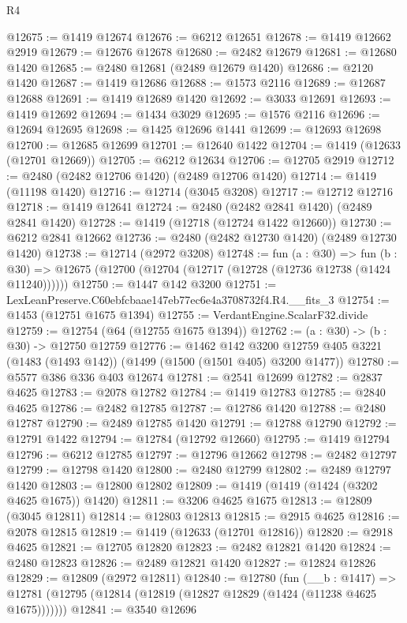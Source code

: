 \begin{lexlean}{R4}
\begin{coremodule}
@12675 := @1419 @12674
@12676 := @6212 @12651
@12678 := @1419 @12662 @2919
@12679 := @12676 @12678
@12680 := @2482 @12679
@12681 := @12680 @1420
@12685 := @2480 @12681 (@2489 @12679 @1420)
@12686 := @2120 @1420
@12687 := @1419 @12686
@12688 := @1573 @2116
@12689 := @12687 @12688
@12691 := @1419 @12689 @1420
@12692 := @3033 @12691
@12693 := @1419 @12692
@12694 := @1434 @3029
@12695 := @1576 @2116
@12696 := @12694 @12695
@12698 := @1425 @12696 @1441
@12699 := @12693 @12698
@12700 := @12685 @12699
@12701 := @12640 @1422
@12704 := @1419 (@12633 (@12701 @12669))
@12705 := @6212 @12634
@12706 := @12705 @2919
@12712 := @2480 (@2482 @12706 @1420) (@2489 @12706 @1420)
@12714 := @1419 (@11198 @1420)
@12716 := @12714 (@3045 @3208)
@12717 := @12712 @12716
@12718 := @1419 @12641
@12724 := @2480 (@2482 @2841 @1420) (@2489 @2841 @1420)
@12728 := @1419 (@12718 (@12724 @1422 @12660))
@12730 := @6212 @2841 @12662
@12736 := @2480 (@2482 @12730 @1420) (@2489 @12730 @1420)
@12738 := @12714 (@2972 @3208)
@12748 := fun (a : @30) =>
  fun (b : @30) => @12675 (@12700 (@12704 (@12717 (@12728 (@12736 @12738 (@1424 @11240))))))
@12750 := @1447 @142 @3200
@12751 := LexLeanPreserve.C60ebfcbaae147eb77ec6e4a3708732f4.R4.__fits_3
@12754 := @1453 (@12751 @1675 @1394)
@12755 := VerdantEngine.ScalarF32.divide
@12759 := @12754 (@64 (@12755 @1675 @1394))
@12762 := (a : @30) -> (b : @30) -> @12750 @12759
@12776 := @1462
    @142
    @3200
    @12759
    @405
    @3221
    (@1483 (@1493 @142))
    (@1499 (@1500 (@1501 @405) @3200 @1477))
@12780 := @5577 @386 @336 @403 @12674
@12781 := @2541 @12699
@12782 := @2837 @4625
@12783 := @2078 @12782
@12784 := @1419 @12783
@12785 := @2840 @4625
@12786 := @2482 @12785
@12787 := @12786 @1420
@12788 := @2480 @12787
@12790 := @2489 @12785 @1420
@12791 := @12788 @12790
@12792 := @12791 @1422
@12794 := @12784 (@12792 @12660)
@12795 := @1419 @12794
@12796 := @6212 @12785
@12797 := @12796 @12662
@12798 := @2482 @12797
@12799 := @12798 @1420
@12800 := @2480 @12799
@12802 := @2489 @12797 @1420
@12803 := @12800 @12802
@12809 := @1419 (@1419 (@1424 (@3202 @4625 @1675)) @1420)
@12811 := @3206 @4625 @1675
@12813 := @12809 (@3045 @12811)
@12814 := @12803 @12813
@12815 := @2915 @4625
@12816 := @2078 @12815
@12819 := @1419 (@12633 (@12701 @12816))
@12820 := @2918 @4625
@12821 := @12705 @12820
@12823 := @2482 @12821 @1420
@12824 := @2480 @12823
@12826 := @2489 @12821 @1420
@12827 := @12824 @12826
@12829 := @12809 (@2972 @12811)
@12840 := @12780
    (fun (__b : @1417) =>
    @12781 (@12795 (@12814 (@12819 (@12827 @12829 (@1424 (@11238 @4625 @1675)))))))
@12841 := @3540 @12696

\end{coremodule}
\end{lexlean}

